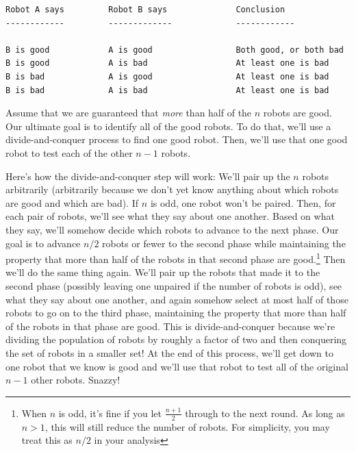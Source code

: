 \documentclass[11pt,addpoints]{exam}
\begin{document}
\begin{questions}
\begin{verbatim}
Robot A says         Robot B says              Conclusion
------------         -------------             ------------

B is good            A is good                 Both good, or both bad
B is good            A is bad                  At least one is bad
B is bad             A is good                 At least one is bad
B is bad             A is bad                  At least one is bad
\end{verbatim}

Assume that we are guaranteed that \emph{more} than half of the $n$ robots are good.  Our ultimate goal is to identify all of the good robots.  To do that, we'll use a divide-and-conquer process to find one good robot.  Then, we'll use that one good robot to test each of the other $n-1$ robots.

 Here's how the divide-and-conquer step will work: We'll pair up the $n$ robots arbitrarily (arbitrarily because we don't yet know anything about 
which robots are good and which are bad).  If $n$ is odd, one robot won't be paired.  Then, for each pair of robots, we'll see what they say about one another.  Based on what they say, we'll somehow decide which robots to advance to the next phase.  Our goal is to advance $n/2$ robots  or fewer to the second phase while maintaining the property that more than half of the robots in that second phase are good.\footnote{When $n$ is odd, it's fine if you let $\frac{n+1}2$ through to the next round.  As long as $n>1$, this will still reduce the number of robots.  For simplicity, you may treat this as $n/2$ in your analysis}
Then we'll do the same thing again.
We'll pair up the robots that made it to the second phase (possibly leaving one unpaired if the number of robots is odd), see what they say about one another, and again somehow select at most half of those robots to go on to the third phase, maintaining the property that more than half of the robots in that phase are good.  This is divide-and-conquer because we're dividing the population of robots by roughly a factor of two and then conquering the set of robots in a smaller set!  At the end of this process, we'll get down to one robot that we know is good and we'll use that robot to test all of the original $n-1$ other robots.  Snazzy!

\end{questions}
\end{document}
